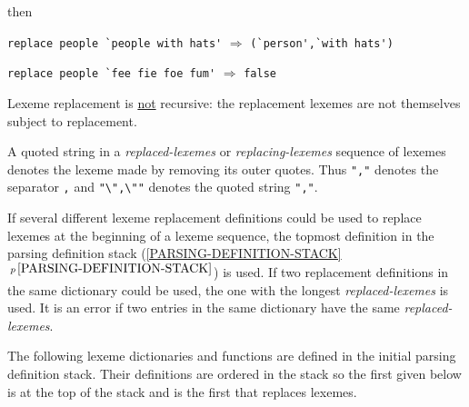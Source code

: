 \documentclass[12pt]{article}
\newcommand{\secref}[1]{\ref{#1}$\,^{p\,\pageref{#1}}$}
\begin{document}
then

\begin{center}
\verb|replace people `people with hats'| $\Longrightarrow$
\verb|(`person',`with hats')|

\verb|replace people `fee fie foe fum'| $\Longrightarrow$ \verb|false|
\end{center}


Lexeme replacement is \underline{not} recursive: the replacement lexemes are
not themselves subject to replacement.

A quoted string in a {\em replaced-lexemes} or {\em replacing-lexemes}
sequence of lexemes denotes the lexeme made by removing its outer quotes.
Thus \verb|","| denotes the separator
\verb|,| and \verb|"\",\""| denotes the quoted string \verb|","|.

If several different lexeme replacement definitions could be used to
replace lexemes at the beginning of a lexeme sequence, the topmost
definition in the parsing definition stack
(\secref{PARSING-DEFINITION-STACK}) is used.
If two replacement definitions in the same dictionary could be used,
the one with the longest {\em replaced-lexemes} is used.  It is an error if
two entries in the same dictionary have the same {\em replaced-lexemes}.

The following lexeme dictionaries and functions are
defined in the initial parsing definition stack.
Their definitions are ordered in the
stack so the first given below is at the top of the stack and is the
first that replaces lexemes.
\end{document}
